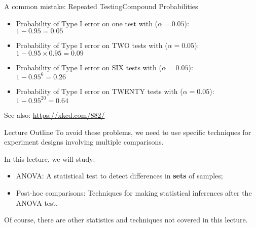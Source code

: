 \begin{frame}{A common mistake: Repeated Testing}{Compound Probabilities}
  \begin{itemize}
    \item Probability of Type I error on one test with ($\alpha = 0.05$):\\
     $1 - 0.95 = 0.05$
    \item Probability of Type I error on TWO tests with ($\alpha = 0.05$):\\
     $1 - 0.95\times 0.95 = 0.09$
    \item Probability of Type I error on SIX tests with ($\alpha = 0.05$):\\
     $1 - 0.95^{6} = 0.26$
    \item Probability of Type I error on TWENTY tests with ($\alpha = 0.05$):\\
     $1 - 0.95^{20} = 0.64$
  \end{itemize}\bigskip

  See also: \url{https://xkcd.com/882/}
\end{frame}


\begin{frame}{Lecture Outline}
  To avoid these problems, we need to use specific techniques for experiment designs involving multiple comparisons.\bigskip

  In this lecture, we will study:
  \begin{itemize}
    \item ANOVA: A statistical test to detect differences in {\bf sets} of samples;
    \item Post-hoc comparisons: Techniques for making statistical inferences after the ANOVA test.
  \end{itemize}\bigskip

  Of course, there are other statistics and techniques not covered in this lecture.
\end{frame}
